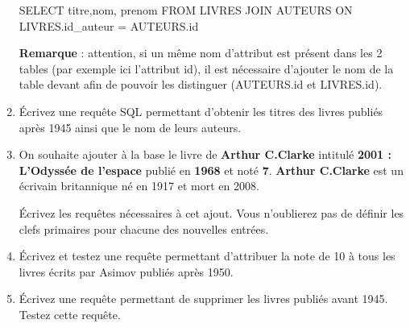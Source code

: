 \documentclass[
  a4paper,
  DIV=11,
  numbers=noendperiod]{scrartcl}
\newenvironment{Shaded}{\begin{snugshade}}{\end{snugshade}}
\newcommand{\KeywordTok}[1]{\textcolor[rgb]{0.00,0.23,0.31}{#1}}
\newcommand{\NormalTok}[1]{\textcolor[rgb]{0.00,0.23,0.31}{#1}}
\newcommand{\OperatorTok}[1]{\textcolor[rgb]{0.37,0.37,0.37}{#1}}
\begin{document}
\begin{enumerate}
\begin{Shaded}
\begin{Highlighting}[]
\KeywordTok{SELECT}\NormalTok{ titre,nom, prenom}
\KeywordTok{FROM}\NormalTok{ LIVRES }\KeywordTok{JOIN}\NormalTok{ AUTEURS }
\KeywordTok{ON}\NormalTok{ LIVRES.id\_auteur }\OperatorTok{=}\NormalTok{ AUTEURS.}\KeywordTok{id}
\end{Highlighting}
\end{Shaded}

  \textbf{Remarque} : attention, si un même nom d'attribut est présent
  dans les 2 tables (par exemple ici l'attribut id), il est nécessaire
  d'ajouter le nom de la table devant afin de pouvoir les distinguer
  (AUTEURS.id et LIVRES.id).
\item
  Écrivez une requête SQL permettant d'obtenir les titres des livres
  publiés après 1945 ainsi que le nom de leurs auteurs.
\item
  On souhaite ajouter à la base le livre de \textbf{Arthur C.Clarke}
  intitulé \textbf{2001 : L'Odyssée de l'espace} publié en \textbf{1968}
  et noté \textbf{7}. \textbf{Arthur C.Clarke} est un écrivain
  britannique né en 1917 et mort en 2008.

  Écrivez les requêtes nécessaires à cet ajout. Vous n'oublierez pas de
  définir les clefs primaires pour chacune des nouvelles entrées.
\item
  Écrivez et testez une requête permettant d'attribuer la note de 10 à
  tous les livres écrits par Asimov publiés après 1950.
\item
  Écrivez une requête permettant de supprimer les livres publiés avant
  1945. Testez cette requête.
\end{enumerate}
\end{document}
